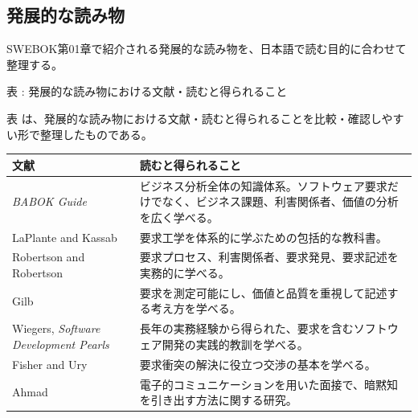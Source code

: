 \subsection{発展的な読み物}

SWEBOK第01章で紹介される発展的な読み物を、日本語で読む目的に合わせて整理する。

\par\smallskip\noindent{}\label{tab:ch01-13}表 \thetable: 発展的な読み物における文献・読むと得られること\par\smallskip
表 \thetable は、発展的な読み物における文献・読むと得られることを比較・確認しやすい形で整理したものである。\par\smallskip
\begin{tabularx}{0.97\linewidth}{@{}p{.31\linewidth}X@{}}
\toprule
文献 & 読むと得られること \\
\midrule
\textit{BABOK Guide} & ビジネス分析全体の知識体系。ソフトウェア要求だけでなく、ビジネス課題、利害関係者、価値の分析を広く学べる。 \\
LaPlante and Kassab & 要求工学を体系的に学ぶための包括的な教科書。 \\
Robertson and Robertson & 要求プロセス、利害関係者、要求発見、要求記述を実務的に学べる。 \\
Gilb & 要求を測定可能にし、価値と品質を重視して記述する考え方を学べる。 \\
Wiegers, \textit{Software Development Pearls} & 長年の実務経験から得られた、要求を含むソフトウェア開発の実践的教訓を学べる。 \\
Fisher and Ury & 要求衝突の解決に役立つ交渉の基本を学べる。 \\
Ahmad & 電子的コミュニケーションを用いた面接で、暗黙知を引き出す方法に関する研究。 \\
\bottomrule
\end{tabularx}
